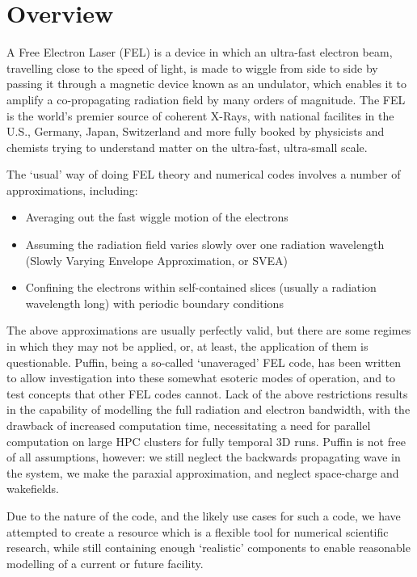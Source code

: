 \section{Overview}

A Free Electron Laser (FEL) is a device in which an ultra-fast electron beam, travelling close to the speed of light, is made to wiggle from side to side by passing it through a magnetic device known as an undulator, which enables it to amplify a co-propagating radiation field by many orders of magnitude. The FEL is the world's premier source of coherent X-Rays, with national facilites in the U.S., Germany, Japan, Switzerland and more fully booked by physicists and chemists trying to understand matter on the ultra-fast, ultra-small scale.

The `usual' way of doing FEL theory and numerical codes involves a number of approximations, including:

\begin{itemize}
\item Averaging out the fast wiggle motion of the electrons
\item Assuming the radiation field varies slowly over one radiation wavelength (Slowly Varying Envelope Approximation, or SVEA)
\item Confining the electrons within self-contained slices (usually a radiation wavelength long) with periodic boundary conditions
\end{itemize}

The above approximations are usually perfectly valid, but there are some regimes in which they may not be applied, or, at least, the application of them is questionable. Puffin, being a so-called `unaveraged' FEL code, has been written to allow investigation into these somewhat esoteric modes of operation, and to test concepts that other FEL codes cannot. Lack of the above restrictions results in the capability of modelling the full radiation and electron bandwidth, with the drawback of increased computation time, necessitating a need for parallel computation on large HPC clusters for fully temporal 3D runs. Puffin is not free of all assumptions, however: we still neglect the backwards propagating wave in the system, we make the paraxial approximation, and neglect space-charge and wakefields.

Due to the nature of the code, and the likely use cases for such a code, we have attempted to create a resource which is a flexible tool for numerical scientific research, while still containing enough `realistic'  components to enable reasonable modelling of a current or future facility.

